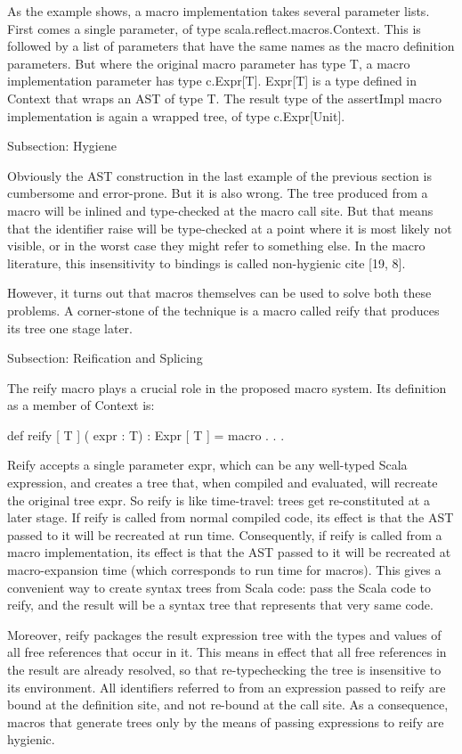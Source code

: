 As the example shows, a macro implementation takes several parameter lists.
First comes a single parameter, of type scala.reflect.macros.Context. This is
followed by a list of parameters that have the same names as the macro
definition parameters. But where the original macro parameter has type T, a
macro implementation parameter has type c.Expr[T]. Expr[T] is a type defined in
Context that wraps an AST of type T. The result type of the
assertImpl macro implementation is again a wrapped tree, of type c.Expr[Unit].


Subsection: Hygiene

Obviously the AST construction in the last example of the
previous section is cumbersome and error-prone. But it is also wrong. The tree
produced from a macro will be inlined and type-checked at the macro call site.
But that means that the identifier raise will be type-checked at a point where
it is most likely not visible, or in the worst case they might refer to
something else. In the macro literature, this insensitivity to bindings is
called non-hygienic {cite [19, 8]}.

However, it turns out that macros themselves can be used to solve both these
problems. A corner-stone of the technique is a macro called reify that produces
its tree one stage later.


Subsection: Reification and Splicing

The reify macro plays a crucial role in the proposed macro system. Its
definition as a member of Context is:

def reify [ T ] ( expr : T) : Expr [ T ] = macro . . .

Reify accepts a single parameter expr, which can be any well-typed Scala
expression, and creates a tree that, when compiled and evaluated, will recreate
the original tree expr. So reify is like time-travel: trees get re-constituted
at a later stage. If reify is called from normal compiled code, its effect is
that the AST passed to it will be recreated at run time.
Consequently, if reify is called from a macro implementation, its effect is that
the AST passed to it will be recreated at macro-expansion time
(which corresponds to run time for macros). This gives a convenient way to
create syntax trees from Scala code: pass the Scala code to reify, and the
result will be a syntax tree that represents that very same code.

Moreover, reify packages the result expression tree with the types and values of
all free references that occur in it. This means in effect that all
free references in the result are already resolved, so that re-typechecking the
tree is insensitive to its environment. All identifiers referred to from
an expression passed to reify are bound at the definition site, and not re-bound
at the call site. As a consequence, macros that generate trees only by the means
of passing expressions to reify are hygienic.


